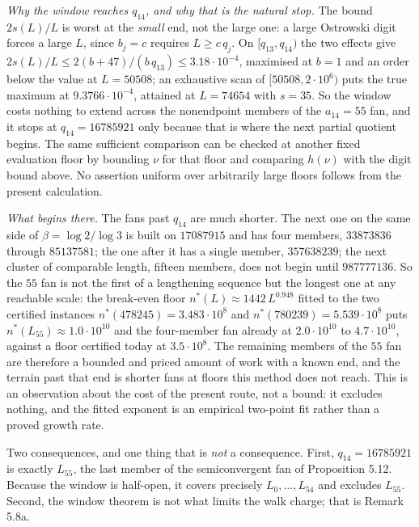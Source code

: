 \documentclass[12pt]{article}
\begin{document}
\emph{Why the window reaches \(q_{14}\), and why that is the natural
stop.} The bound \(2s(L)/L\) is worst at the \emph{small} end, not the
large one: a large Ostrowski digit forces a large \(L\), since \(b_j=c\)
requires \(L\ge c\,q_j\). On \([q_{13},q_{14})\) the two effects give
\(2s(L)/L\le 2(b+47)/(b\,q_{13})\le3.18\cdot10^{-4}\), maximised at
\(b=1\) and an order below the value at \(L=50508\); an exhaustive scan
of \([50508,2\cdot10^{6})\) puts the true maximum at
\(9.3766\cdot10^{-4}\), attained at \(L=74654\) with \(s=35\). So the
window costs nothing to extend across the nonendpoint members of the
\(a_{14}=55\) fan, and it stops at \(q_{14}=16785921\) only because that
is where the next partial quotient begins. The same sufficient
comparison can be checked at another fixed evaluation floor by bounding
\(\nu\) for that floor and comparing \(h(\nu)\) with the digit bound
above. No assertion uniform over arbitrarily large floors follows from
the present calculation.

\emph{What begins there.} The fans past \(q_{14}\) are much shorter. The
next one on the same side of \(\beta=\log2/\log3\) is built on
\(17087915\) and has four members, \(33873836\) through \(85137581\);
the one after it has a single member, \(357638239\); the next cluster of
comparable length, fifteen members, does not begin until \(987777136\).
So the \(55\) fan is not the first of a lengthening sequence but the
longest one at any reachable scale: the break-even floor
\(n^{*}(L)\approx1442\,L^{0.948}\) fitted to the two certified instances
\(n^{*}(478245)=3.483\cdot10^{8}\) and
\(n^{*}(780239)=5.539\cdot10^{8}\) puts
\(n^{*}(L_{55})\approx1.0\cdot10^{10}\) and the four-member fan already
at \(2.0\cdot10^{10}\) to \(4.7\cdot10^{10}\), against a floor certified
today at \(3.5\cdot10^{8}\). The remaining members of the \(55\) fan are
therefore a bounded and priced amount of work with a known end, and the
terrain past that end is shorter fans at floors this method does not
reach. This is an observation about the cost of the present route, not a
bound: it excludes nothing, and the fitted exponent is an empirical
two-point fit rather than a proved growth rate.

Two consequences, and one thing that is \emph{not} a consequence. First,
\(q_{14}=16785921\) is exactly \(L_{55}\), the last member of the
semiconvergent fan of Proposition 5.12. Because the window is half-open,
it covers precisely \(L_0,\ldots,L_{54}\) and excludes \(L_{55}\).
Second, the window theorem is not what limits the walk charge; that is
Remark 5.8a.
\end{document}

